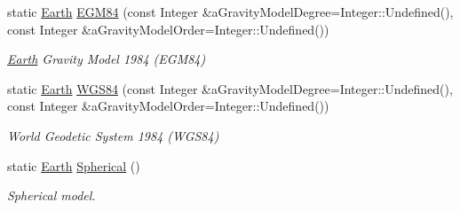 \begin{DoxyCompactItemize}
static \hyperlink{classostk_1_1physics_1_1env_1_1obj_1_1celest_1_1_earth}{Earth} \hyperlink{classostk_1_1physics_1_1env_1_1obj_1_1celest_1_1_earth_ac9e279bcd59917a3e153c52c74639005}{E\+G\+M84} (const Integer \&a\+Gravity\+Model\+Degree=Integer\+::\+Undefined(), const Integer \&a\+Gravity\+Model\+Order=Integer\+::\+Undefined())
\begin{DoxyCompactList}\small\item\em \hyperlink{classostk_1_1physics_1_1env_1_1obj_1_1celest_1_1_earth}{Earth} Gravity Model 1984 (E\+G\+M84) \end{DoxyCompactList}\item 
static \hyperlink{classostk_1_1physics_1_1env_1_1obj_1_1celest_1_1_earth}{Earth} \hyperlink{classostk_1_1physics_1_1env_1_1obj_1_1celest_1_1_earth_a463005e1807fa7d6baec9cc677dd69e1}{W\+G\+S84} (const Integer \&a\+Gravity\+Model\+Degree=Integer\+::\+Undefined(), const Integer \&a\+Gravity\+Model\+Order=Integer\+::\+Undefined())
\begin{DoxyCompactList}\small\item\em World Geodetic System 1984 (W\+G\+S84) \end{DoxyCompactList}\item 
static \hyperlink{classostk_1_1physics_1_1env_1_1obj_1_1celest_1_1_earth}{Earth} \hyperlink{classostk_1_1physics_1_1env_1_1obj_1_1celest_1_1_earth_ad0acee4f4eba8b80c7ed962ca86773fa}{Spherical} ()
\begin{DoxyCompactList}\small\item\em Spherical model. \end{DoxyCompactList}\end{DoxyCompactItemize}
